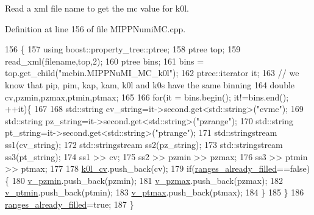 Read a xml file name to get the mc value for k0l. 



Definition at line 156 of file M\-I\-P\-P\-Numi\-M\-C.\-cpp.


\begin{DoxyCode}
156                                                       \{
157     \textcolor{keyword}{using} boost::property\_tree::ptree;
158     ptree top;
159     read\_xml(filename,top,2); 
160     ptree bins;
161     bins = top.get\_child(\textcolor{stringliteral}{"mcbin.MIPPNuMI\_MC\_k0l"});
162     ptree::iterator it;    
163     \textcolor{comment}{// we know that pip, pim, kap, kam, k0l and k0s have the same binning}
164     \textcolor{keywordtype}{double} cv,pzmin,pzmax,ptmin,ptmax;
165     
166     \textcolor{keywordflow}{for}(it = bins.begin(); it!=bins.end(); ++it)\{
167    
168       std::string cv\_string=it->second.get<std::string>(\textcolor{stringliteral}{"cvmc"});
169       std::string pz\_string=it->second.get<std::string>(\textcolor{stringliteral}{"pzrange"});
170       std::string pt\_string=it->second.get<std::string>(\textcolor{stringliteral}{"ptrange"});
171       std::stringstream ss1(cv\_string);
172       std::stringstream ss2(pz\_string);
173       std::stringstream ss3(pt\_string);
174       ss1 >> cv;
175       ss2 >> pzmin >> pzmax;
176       ss3 >> ptmin >> ptmax;
177    
178       \hyperlink{class_neutrino_flux_reweight_1_1_m_i_p_p_numi_m_c_a5bca60d2733426f0f113f9be6035cef4}{k0l\_cv}.push\_back(cv);
179       \textcolor{keywordflow}{if}(\hyperlink{class_neutrino_flux_reweight_1_1_m_i_p_p_numi_m_c_a13918556257e6e07eb9c83cb9c029a94}{ranges\_already\_filled}==\textcolor{keyword}{false})\{
180         \hyperlink{class_neutrino_flux_reweight_1_1_m_i_p_p_numi_m_c_af6796ed5716ee06589ab1ba6e09fcd82}{v\_pzmin}.push\_back(pzmin);
181         \hyperlink{class_neutrino_flux_reweight_1_1_m_i_p_p_numi_m_c_ac4e9e478e2456cd112522650850b507c}{v\_pzmax}.push\_back(pzmax);
182         \hyperlink{class_neutrino_flux_reweight_1_1_m_i_p_p_numi_m_c_a105e858db8bf5e6b94a69b196815d98a}{v\_ptmin}.push\_back(ptmin);
183         \hyperlink{class_neutrino_flux_reweight_1_1_m_i_p_p_numi_m_c_afab2e17efd7d42565f3e1c8a84064349}{v\_ptmax}.push\_back(ptmax);
184       \}
185     \}
186     \hyperlink{class_neutrino_flux_reweight_1_1_m_i_p_p_numi_m_c_a13918556257e6e07eb9c83cb9c029a94}{ranges\_already\_filled}=\textcolor{keyword}{true};
187   \}
\end{DoxyCode}
